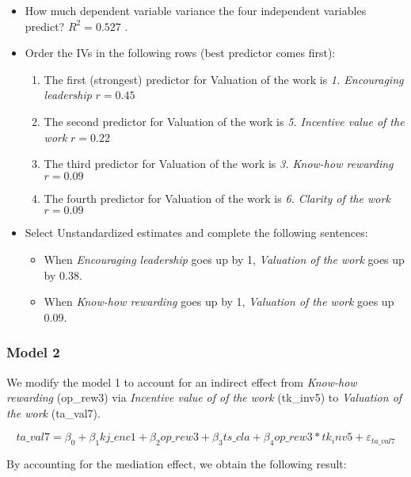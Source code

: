 \documentclass[
]{article}
\providecommand{\tightlist}{%
  \setlength{\itemsep}{0pt}\setlength{\parskip}{0pt}}
\begin{document}
\begin{itemize}
\item
  How much dependent variable variance the four independent variables
  predict? \(R^2 = 0.527\) .
\item
  Order the IVs in the following rows (best predictor comes first):

  \begin{enumerate}
  \def\labelenumi{\arabic{enumi}.}
  \tightlist
  \item
    The first (strongest) predictor for Valuation of the work is
    \emph{1. Encouraging leadership} \(r = 0.45\)
  \item
    The second predictor for Valuation of the work is \emph{5. Incentive
    value of the work} \(r = 0.22\)
  \item
    The third predictor for Valuation of the work is \emph{3. Know-how
    rewarding} \(r = 0.09\)
  \item
    The fourth predictor for Valuation of the work is \emph{6. Clarity
    of the work} \(r = 0.09\)
  \end{enumerate}
\item
  Select Unstandardized estimates and complete the following sentences:

  \begin{itemize}
  \tightlist
  \item
    When \emph{Encouraging leadership} goes up by 1, \emph{Valuation of
    the work} goes up by 0.38.
  \item
    When \emph{Know-how rewarding} goes up by 1, \emph{Valuation of the
    work} goes up 0.09.
  \end{itemize}
\end{itemize}

\hypertarget{model-2}{%
\subsubsection{Model 2}\label{model-2}}

We modify the model 1 to account for an indirect effect from
\emph{Know-how rewarding} (op\_rew3) via \emph{Incentive value of of the
work} (tk\_inv5) to \emph{Valuation of the work} (ta\_val7).

\[ta\_val7 = \beta_0 + \beta_1 kj\_enc1 + \beta_2 op\_rew3 + \beta_3ts\_cla + \beta_4 op\_rew3 * tk_inv5 + \varepsilon_{ta\_val7}\]

By accounting for the mediation effect, we obtain the following result:
\end{document}

